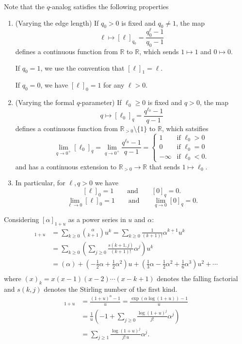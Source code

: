 \documentclass{amsart}
\theoremstyle{definition}
\newcommand{\RR}{\mathbb{R}}
\newcommand{\RRpos}{\RR_{>0}}
\begin{document}
Note that the $q$-analog satisfies the following properties
\begin{enumerate}
\item (Varying the edge length) If $q_0>0$ is fixed and $q_0 \neq 1$, the map 
$$\ell \mapsto [\ell]_{q_0} = \frac{q_0^\ell - 1}{q_0 - 1}$$
defines a continuous function from $\RR$ to $\RR$,
which sends $1 \mapsto 1$ and $0 \mapsto 0$.

If $q_0 = 1$,
we use the convention that $[\ell]_1 = \ell$.

If $q_0 = 0$,
we have $[\ell]_0 = 1$ for any $\ell > 0$.

\item (Varying the formal $q$-parameter) If $\ell_0\geq 0$ is fixed and $q > 0$,
the map 
$$q \mapsto [\ell_0]_q = \frac{q^{\ell_0} - 1}{q - 1}$$
defines a continuous function from $\RRpos \setminus\{1\}$ to $\RR$,
which satsifies
$$ \lim_{q \to 0^+} [\ell_0]_q  = 
\lim_{q \to 0^+} \frac{q^{\ell_0} - 1}{q - 1} =
\begin{cases}
 1 &\text{if } \ell_0 > 0 \\
 0 &\text{if } \ell_0 = 0 \\
 -\infty &\text{if } \ell_0 <0.
\end{cases}$$
and has a continuous extension to $\RRpos \to \RR$ that sends $1 \mapsto \ell_0$.

\item 
In particular, for $\ell, q > 0$ we have
$$
[\ell]_0 = 1 
\qquad\text{and}\qquad
[0]_q = 0.
$$
$$
\lim_{\ell \to 0} [\ell]_0 = 1 
\qquad\text{and}\qquad
\lim_{q \to 0} [0]_q = 0.
$$
\end{enumerate}

Considering $[\alpha]_{1+u}$ as a power series in $u$ and $\alpha$:
\begin{align*}
[\alpha]_{1+u} &= \sum_{k\geq 0} \binom{\alpha}{k+1}u^k  
= \sum_{k\geq 0} \frac1{(k+1)!} \alpha^{\underline{k+1}} u^k \\
&= \sum_{k\geq 0} \left( \sum_{j \geq 0} \frac{s(k+1,j)}{(k+1)!} \alpha^j \right) u^k \\
&= (\alpha) + (-\frac12\alpha + \frac12 \alpha^2)u + (\frac13\alpha - \frac12 \alpha^2 + \frac16 \alpha^3)u^2 + \cdots \\
\end{align*}
where $(x)_k = x(x-1)(x-2)\cdots(x-k+1)$ denotes the falling factorial and $s(k,j)$ denotes the Stirling number of the first kind.
\begin{align*}
[\alpha]_{1+u} &= \frac{(1+u)^\alpha - 1}{u}
= \frac{\exp(\alpha \log(1+u)) - 1}{u} \\
&= \frac1{u} \left( -1 + \sum_{j\geq 0} \frac{\log(1+u)^j}{j!} \alpha^j\right) \\
&= \sum_{j\geq 1} \frac{\log(1+u)^j}{j! \, u} \alpha^j .
\end{align*}
\end{document}
